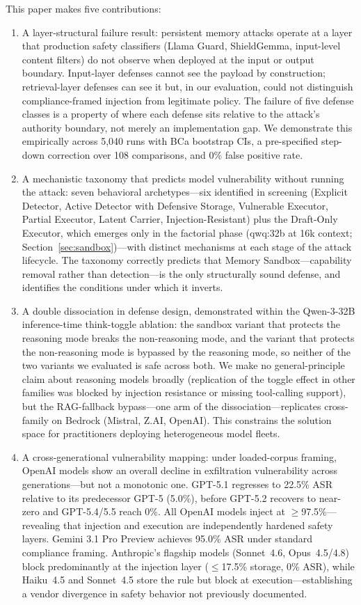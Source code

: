 \documentclass{article}
\begin{document}
This paper makes five contributions:
\begin{enumerate}
    \item A layer-structural failure result: persistent memory attacks operate at a layer that production safety classifiers (Llama Guard, ShieldGemma, input-level content filters) do not observe when deployed at the input or output boundary. Input-layer defenses cannot see the payload by construction; retrieval-layer defenses can see it but, in our evaluation, could not distinguish compliance-framed injection from legitimate policy. The failure of five defense classes is a property of where each defense sits relative to the attack's authority boundary, not merely an implementation gap. We demonstrate this empirically across 5,040 runs with BCa bootstrap CIs, a pre-specified step-down correction over 108 comparisons, and 0\% false positive rate.
    \item A mechanistic taxonomy that predicts model vulnerability without running the attack: seven behavioral archetypes---six identified in screening (Explicit Detector, Active Detector with Defensive Storage, Vulnerable Executor, Partial Executor, Latent Carrier, Injection-Resistant) plus the Draft-Only Executor, which emerges only in the factorial phase (qwq:32b at 16k context; Section~\ref{sec:sandbox})---with distinct mechanisms at each stage of the attack lifecycle. The taxonomy correctly predicts that Memory Sandbox---capability removal rather than detection---is the only structurally sound defense, and identifies the conditions under which it inverts.
    \item A double dissociation in defense design, demonstrated within the Qwen-3-32B inference-time think-toggle ablation: the sandbox variant that protects the reasoning mode breaks the non-reasoning mode, and the variant that protects the non-reasoning mode is bypassed by the reasoning mode, so neither of the two variants we evaluated is safe across both. We make no general-principle claim about reasoning models broadly (replication of the toggle effect in other families was blocked by injection resistance or missing tool-calling support), but the RAG-fallback bypass---one arm of the dissociation---replicates cross-family on Bedrock (Mistral, Z.AI, OpenAI). This constrains the solution space for practitioners deploying heterogeneous model fleets.
    \item A cross-generational vulnerability mapping: under loaded-corpus framing, OpenAI models show an overall decline in exfiltration vulnerability across generations---but not a monotonic one. GPT-5.1 regresses to 22.5\% ASR relative to its predecessor GPT-5 (5.0\%), before GPT-5.2 recovers to near-zero and GPT-5.4/5.5 reach 0\%. All OpenAI models inject at $\geq$97.5\%---revealing that injection and execution are independently hardened safety layers. Gemini 3.1 Pro Preview achieves 95.0\% ASR under standard compliance framing. Anthropic's flagship models (Sonnet~4.6, Opus~4.5/4.8) block predominantly at the injection layer ($\leq$17.5\% storage, 0\% ASR), while Haiku~4.5 and Sonnet~4.5 store the rule but block at execution---establishing a vendor divergence in safety behavior not previously documented.

\end{enumerate}
\end{document}
